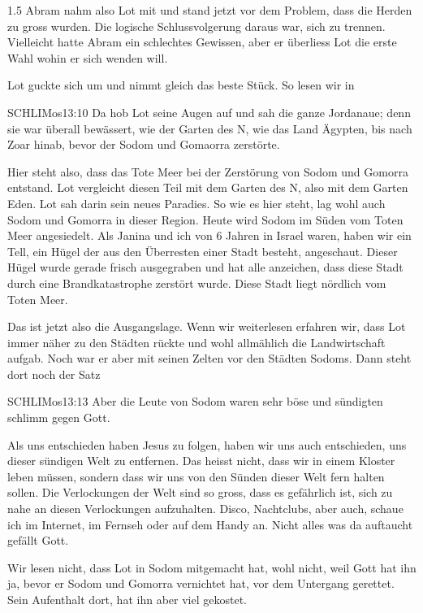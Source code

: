 \documentclass[fontsize=14pt]{../../inc/mybib}
\begin{document}
\begin{spacing}{1.5}
    Abram nahm also Lot mit und stand jetzt vor dem Problem, dass die Herden zu gross wurden. Die logische Schlussvolgerung daraus war, sich zu trennen. Vielleicht hatte Abram ein schlechtes Gewissen, aber er überliess Lot die erste Wahl wohin er sich wenden will. 
    
    Lot guckte sich um und nimmt gleich das beste Stück. So lesen wir in
    \begin{bibelbox}{SCHL}{IMos}{13:10}
    Da hob Lot seine Augen auf und sah die ganze Jordanaue; denn sie war überall bewässert, wie der Garten des \herr N, wie das Land Ägypten, bis nach Zoar hinab, bevor der \herr{} Sodom und Gomaorra zerstörte.
    \end{bibelbox}
    Hier steht also, dass das Tote Meer bei der Zerstörung von Sodom und Gomorra entstand.
    Lot vergleicht diesen Teil mit dem Garten des \herr N, also mit dem Garten Eden. Lot sah darin sein neues Paradies. So wie es hier steht, lag wohl auch Sodom und Gomorra in dieser Region. Heute wird Sodom im Süden vom Toten Meer angesiedelt. Als Janina und ich von 6 Jahren in Israel waren, haben wir ein Tell, ein Hügel der aus den Überresten einer Stadt besteht, angeschaut. Dieser Hügel wurde gerade frisch ausgegraben und hat alle anzeichen, dass diese Stadt durch eine Brandkatastrophe zerstört wurde. Diese Stadt liegt nördlich vom Toten Meer. 

    Das ist jetzt also die Ausgangslage. Wenn wir weiterlesen erfahren wir, dass Lot immer näher zu den Städten rückte und wohl allmählich die Landwirtschaft aufgab. Noch war er aber mit seinen Zelten vor den Städten Sodoms. Dann steht dort noch der Satz
    \begin{bibelbox}{SCHL}{IMos}{13:13}
    Aber die Leute von Sodom waren sehr böse und sündigten schlimm gegen Gott.
    \end{bibelbox}

    Als  uns entschieden haben Jesus zu folgen, haben wir uns auch entschieden, uns dieser sündigen Welt zu entfernen. Das heisst nicht, dass wir in einem Kloster leben müssen, sondern dass wir uns von den Sünden dieser Welt fern halten sollen. Die Verlockungen der Welt sind so gross, dass es gefährlich ist, sich zu nahe an diesen Verlockungen aufzuhalten. Disco, Nachtclubs, aber auch,  schaue ich im Internet, im Fernseh oder auf dem Handy an. Nicht alles was da auftaucht gefällt Gott. 
    
    Wir lesen nicht, dass Lot in Sodom mitgemacht hat, wohl nicht, weil Gott hat ihn ja, bevor er Sodom und Gomorra vernichtet hat, vor dem Untergang gerettet. Sein Aufenthalt dort, hat ihn aber viel gekostet.  
    

\end{spacing}
\end{document}
